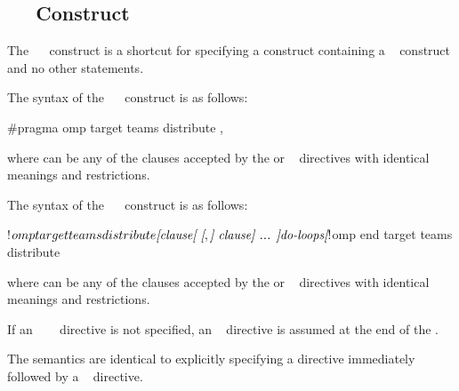 \subsection{~~ Construct}
\label{subsec:target teams distribute construct}
\summary
The ~~ construct is a shortcut for specifying a  construct
containing a ~ construct and no other statements.

\syntax
\begin{ccppspecific}
The syntax of the ~~ construct is as follows:

\begin{ompcPragma}
#pragma omp target teams distribute \plc{[clause[ [},\plc{] clause] ... ] new-line}
\end{ompcPragma}

where  can be any of the clauses accepted by the  or ~ directives
with identical meanings and restrictions.
\end{ccppspecific}

\begin{fortranspecific}
The syntax of the ~~ construct is as follows:

\begin{ompfPragma}
!$omp target teams distribute \plc{[clause[ [},\plc{] clause] ... ]}
    \plc{do-loops}
\plc{[}!$omp end target teams distribute\plc{]}
\end{ompfPragma}

where  can be any of the clauses accepted by the  or ~ directives
with identical meanings and restrictions.

If an ~~~ directive is not specified, an
~   directive is assumed at the end of the .
\end{fortranspecific}

\descr
The semantics are identical to explicitly specifying a  directive immediately
followed by a ~ directive.

